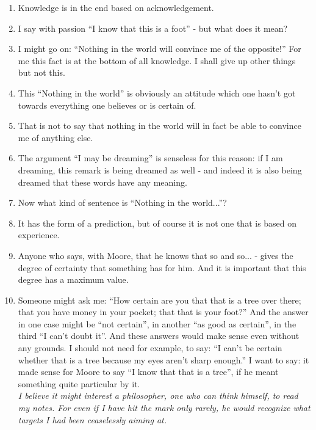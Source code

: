 \documentclass{book}
\begin{document}
\begin{enumerate}
\item
Knowledge is in the end based on acknowledgement.

\item
I say with passion ``I know that this is a foot'' - but what does it mean?

\item
I might go on: ``Nothing in the world will convince me of the opposite!'' For
me this fact is at the bottom of all knowledge. I shall give up other things
but not this.

\item
This ``Nothing in the world'' is obviously an attitude which one hasn't got
towards everything one believes or is certain of.

\item
That is not to say that nothing in the world will in fact be able to convince
me of anything else.

\item
The argument ``I may be dreaming'' is senseless for this reason: if I am
dreaming, this remark is being dreamed as well - and indeed it is also being
dreamed that these words have any meaning.

\item
Now what kind of sentence is ``Nothing in the world...''?

\item
It has the form of a prediction, but of course it is not one that is based on
experience.

\item
Anyone who says, with Moore, that he knows that so and so... - gives the degree
of certainty that something has for him. And it is important that this degree
has a maximum value.

\item
Someone might ask me: ``How certain are you that that is a tree over there;
that you have money in your pocket; that that is your foot?'' And the answer in
one case might be ``not certain'', in another ``as good as certain'', in the
third ``I can't doubt it''. And these answers would make sense even without any
grounds. I should not need for example, to say: ``I can't be certain whether
that is a tree because my eyes aren't sharp enough.'' I want to say: it made
sense for Moore to say ``I know that that is a tree'', if he meant something
quite particular by it.
\\
\emph{I believe it might interest a philosopher, one who can think himself, to
read my notes. For even if I have hit the mark only rarely, he would recognize
what targets I had been ceaselessly aiming at.}


\end{enumerate}
\end{document}
